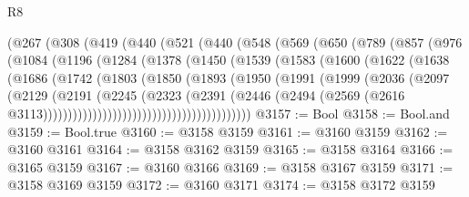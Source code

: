 \begin{lexlean}{R8}
\begin{coremodule}
      (@267
        (@308
          (@419
            (@440
              (@521
                (@440
                  (@548
                    (@569
                      (@650
                        (@789
                          (@857
                            (@976
                              (@1084
                                (@1196
                                  (@1284
                                    (@1378
                                      (@1450
                                        (@1539
                                          (@1583
                                            (@1600
                                              (@1622
                                                (@1638
                                                  (@1686
                                                    (@1742
                                                      (@1803
                                                        (@1850
                                                          (@1893
                                                            (@1950
                                                              (@1991
                                                                (@1999
                                                                  (@2036
                                                                    (@2097
                                                                      (@2129
                                                                        (@2191
                                                                          (@2245
                                                                            (@2323
                                                                              (@2391
                                                                                (@2446
                                                                                  (@2494
                                                                                    (@2569
                                                                                      (@2616
                                                                                        @3113))))))))))))))))))))))))))))))))))))))))))
@3157 := Bool
@3158 := Bool.and
@3159 := Bool.true
@3160 := @3158 @3159
@3161 := @3160 @3159
@3162 := @3160 @3161
@3164 := @3158 @3162 @3159
@3165 := @3158 @3164
@3166 := @3165 @3159
@3167 := @3160 @3166
@3169 := @3158 @3167 @3159
@3171 := @3158 @3169 @3159
@3172 := @3160 @3171
@3174 := @3158 @3172 @3159

\end{coremodule}
\end{lexlean}
